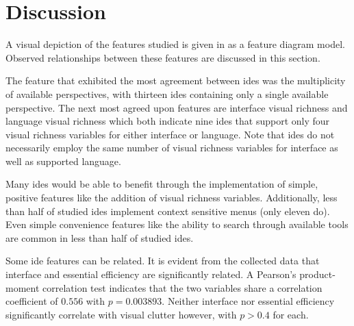 \section{Discussion}
\label{sec:discussion}

A visual depiction of the features studied is given in
 as a feature diagram model. Observed relationships
between these features are discussed in this section.

The feature that exhibited the most agreement between \acp{ide} was the
multiplicity of available perspectives, with thirteen \acp{ide} containing
only a single available perspective. The next most agreed upon features are
interface visual richness and language visual richness which both indicate
nine \acp{ide} that support only four visual richness variables for either
interface or language. Note that \acp{ide} do not necessarily employ the
same number of visual richness variables for interface as well as supported
language.

Many \acp{ide} would be able to benefit through the implementation of
simple, positive features like the addition of visual richness variables.
Additionally, less than half of studied \acp{ide} implement context
sensitive menus (only eleven do). Even simple convenience features like the
ability to search through available tools are common in less than half of
studied \acp{ide}.

Some \ac{ide} features can be related. It is evident from the collected
data that interface and essential efficiency are significantly related. A
Pearson's product-moment correlation test indicates that the two variables
share a correlation coefficient of $0.556$ with $p=0.003893$. Neither
interface nor essential efficiency significantly correlate with visual
clutter however, with $p>0.4$ for each.
